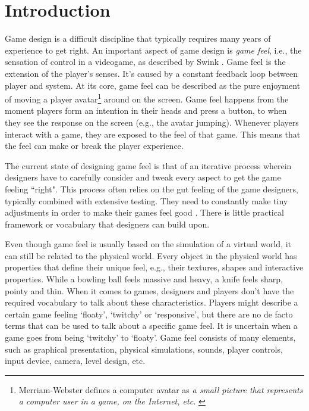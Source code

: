 \section{Introduction}
Game design is a difficult discipline that typically requires many years of experience to get right. An important aspect of game design is \textit{game feel}, i.e., the sensation of control in a videogame, as described by Swink \cite{swink}. Game feel is the extension of the player's senses. It's caused by a constant feedback loop between player and system. At its core, game feel can be described as the pure enjoyment of moving a player avatar\footnote{Merriam-Webster defines a computer avatar as \textit{a small picture that represents a computer user in a game, on the Internet, etc.} \cite{avatar}} around on the screen. Game feel happens from the moment players form an intention in their heads and press a button, to when they see the response on the screen (e.g., the avatar jumping). Whenever players interact with a game, they are exposed to the feel of that game. This means that the feel can make or break the player experience.

The current state of designing game feel is that of an iterative process wherein designers have to carefully consider and tweak every aspect to get the game feeling ``right". This process often relies on the gut feeling of the game designers, typically combined with extensive testing. They need to constantly make tiny adjustments in order to make their games feel good \cite{meatboy1, meatboy2, juicyBeast, platformer_controls, gameFeelTips}. There is little practical framework or vocabulary that designers can build upon.

Even though game feel is usually based on the simulation of a virtual world, it can still be related to the physical world. Every object in the physical world has properties that define their unique feel, e.g., their textures, shapes and interactive properties. While a bowling ball feels massive and heavy, a knife feels sharp, pointy and thin. When it comes to games, designers and players don't have the required vocabulary to talk about these characteristics. Players might describe a certain game feeling `floaty', `twitchy' or `responsive', but there are no de facto terms that can be used to talk about a specific game feel. It is uncertain when a game goes from being `twitchy' to `floaty'. Game feel consists of many elements, such as graphical presentation, physical simulations, sounds, player controls, input device, camera, level design, etc. 

